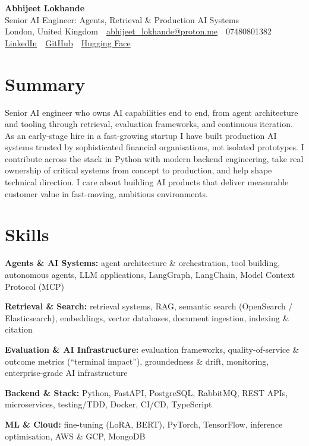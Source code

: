 \documentclass[10pt,a4paper]{article}
\newcommand{\sep}{\,\textcolor{accent!60}{\textbar}\,}
\begin{document}
\begin{center}
  {\fontsize{24}{26}\selectfont\bfseries Abhijeet Lokhande}\\[3pt]
  {\color{accent}\large Senior AI Engineer: Agents, Retrieval \& Production AI Systems}\\[5pt]
  {\small
    London, United Kingdom \sep
    \href{mailto:abhijeet_lokhande@proton.me}{abhijeet\_lokhande@proton.me} \sep
    07480801382 \\[2pt]
    \href{https://www.linkedin.com/in/ablds/}{LinkedIn} \sep
    \href{https://github.com/abhijeetscode}{GitHub} \sep
    \href{https://huggingface.co/ab-ai}{Hugging Face}
  }
\end{center}
\vspace{2pt}

\section{Summary}
Senior AI engineer who owns AI capabilities end to end, from agent architecture and tooling through retrieval, evaluation frameworks, and continuous iteration. As an early-stage hire in a fast-growing startup I have built production AI systems trusted by sophisticated financial organisations, not isolated prototypes. I contribute across the stack in Python with modern backend engineering, take real ownership of critical systems from concept to production, and help shape technical direction. I care about building AI products that deliver measurable customer value in fast-moving, ambitious environments.

\section{Skills}
\begin{tight}
  \item[\textcolor{accent}{\small$\bullet$}] \textbf{Agents \& AI Systems:} agent architecture \& orchestration, tool building, autonomous agents, LLM applications, LangGraph, LangChain, Model Context Protocol (MCP)
  \item[\textcolor{accent}{\small$\bullet$}] \textbf{Retrieval \& Search:} retrieval systems, RAG, semantic search (OpenSearch / Elasticsearch), embeddings, vector databases, document ingestion, indexing \& citation
  \item[\textcolor{accent}{\small$\bullet$}] \textbf{Evaluation \& AI Infrastructure:} evaluation frameworks, quality-of-service \& outcome metrics (``terminal impact''), groundedness \& drift, monitoring, enterprise-grade AI infrastructure
  \item[\textcolor{accent}{\small$\bullet$}] \textbf{Backend \& Stack:} Python, FastAPI, PostgreSQL, RabbitMQ, REST APIs, microservices, testing/TDD, Docker, CI/CD, TypeScript
  \item[\textcolor{accent}{\small$\bullet$}] \textbf{ML \& Cloud:} fine-tuning (LoRA, BERT), PyTorch, TensorFlow, inference optimisation, AWS \& GCP, MongoDB
\end{tight}
\end{document}
